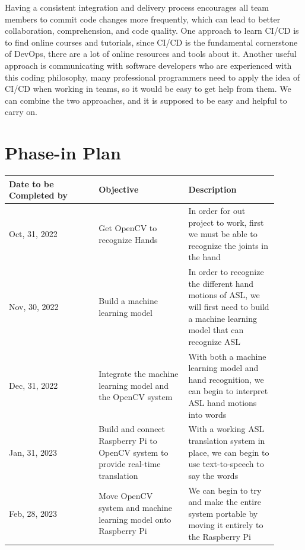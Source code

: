 \documentclass[12pt]{article}
\begin{document}
Having a consistent integration and delivery process encourages all team members to commit code changes more frequently, which can lead to better collaboration, comprehension, and code quality. 
One approach to learn CI/CD is to find online courses and tutorials, since CI/CD is the fundamental cornerstone of DevOps, there are a lot of online resources and tools about it. 
Another useful approach is communicating with software developers who are experienced with this coding philosophy, many professional programmers need to apply the idea of CI/CD when working in teams, so it would be easy to get help from them.
We can combine the two approaches, and it is supposed to be easy and helpful to carry on.\\

\section{Phase-in Plan}

\renewcommand{\arraystretch}{1.2}
\noindent \begin{tabularx}{\textwidth}{p{0.3\linewidth}|p{0.3\linewidth}|p{0.3\linewidth}}
\toprule
\textbf{Date to be Completed by} & \textbf{Objective} & \textbf{Description}\\
\midrule
Oct, 31, 2022
& Get OpenCV to recognize Hands
& In order for out project to work, first we 
must be able to recognize the joints in the hand\\
\hline
Nov, 30, 2022
& Build a machine learning model
& In order to recognize the different hand motions
of ASL, we will first need to build a machine learning
model that can recognize ASL\\
\hline
Dec, 31, 2022
& Integrate the machine learning model and the OpenCV 
system
& With both a machine learning model and hand recognition,
we can begin to interpret ASL hand motions into words\\
\hline
Jan, 31, 2023
& Build and connect Raspberry Pi to OpenCV system to 
provide real-time translation
& With a working ASL translation system in place, we 
can begin to use text-to-speech to say the words\\
\hline
Feb, 28, 2023
& Move OpenCV system and machine learning model onto 
Raspberry Pi
& We can begin to try and make the entire system portable 
by moving it entirely to the Raspberry Pi\\
\bottomrule
\end{tabularx}
\end{document}
